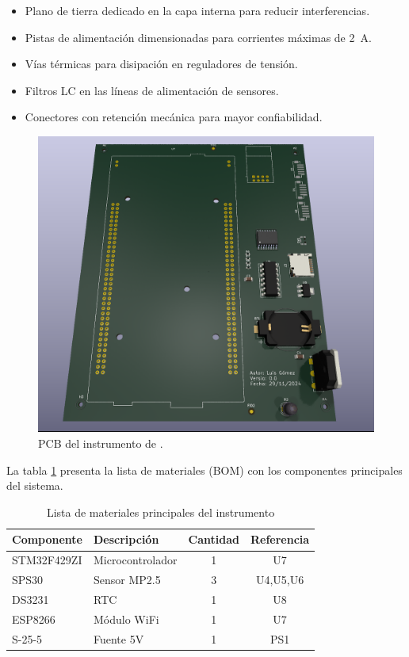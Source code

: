 \begin{itemize}
	\item Plano de tierra dedicado en la capa interna para reducir interferencias.
	\item Pistas de alimentación dimensionadas para corrientes máximas de \SI{2}{\ampere}.
	\item Vías térmicas para disipación en reguladores de tensión.
	\item Filtros LC en las líneas de alimentación de sensores.
	\item Conectores con retención mecánica para mayor confiabilidad.
\end{itemize}



\begin{figure}[H]
	\centering
	\includegraphics[width=1\linewidth]{Figures/PCB_Tesis_MP}
	\caption{PCB del instrumento de \MPF.}
	\label{fig:pcbtesismp}
\end{figure}


La tabla \ref{tab:bom} presenta la lista de materiales (BOM) con los componentes principales del sistema.

\begin{table}[!hbp]
	\centering
	\caption{Lista de materiales principales del instrumento}
	\label{tab:bom}
	\small
	\begin{tabular}{llcc}
		\toprule
		\textbf{Componente} & \textbf{Descripción} & \textbf{Cantidad} & \textbf{Referencia} \\
		\midrule
		STM32F429ZI & Microcontrolador & 1 & U7 \\
		SPS30 & Sensor MP2.5 & 3 & U4,U5,U6 \\
		DS3231 & RTC & 1 & U8 \\
		ESP8266 & Módulo WiFi & 1 & U7 \\
		S-25-5 & Fuente 5V & 1 & PS1 \\
		\bottomrule
	\end{tabular}
\end{table}


